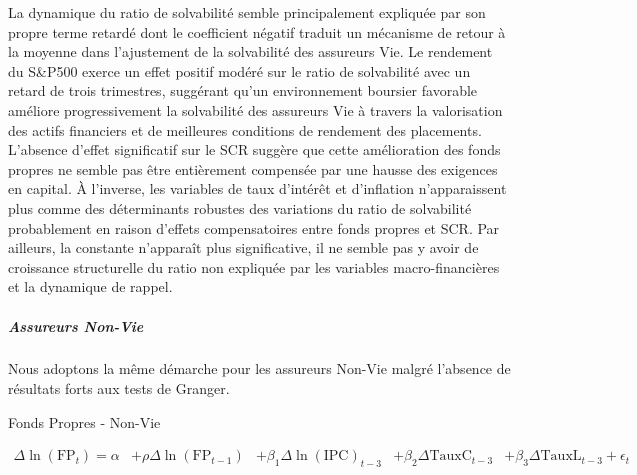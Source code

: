 \documentclass[
]{article}
\begin{document}
La dynamique du ratio de solvabilité semble principalement expliquée par
son propre terme retardé dont le coefficient négatif traduit un
mécanisme de retour à la moyenne dans l'ajustement de la solvabilité des
assureurs Vie. Le rendement du S\&P500 exerce un effet positif modéré
sur le ratio de solvabilité avec un retard de trois trimestres,
suggérant qu'un environnement boursier favorable améliore
progressivement la solvabilité des assureurs Vie à travers la
valorisation des actifs financiers et de meilleures conditions de
rendement des placements. L'absence d'effet significatif sur le SCR
suggère que cette amélioration des fonds propres ne semble pas être
entièrement compensée par une hausse des exigences en capital. À
l'inverse, les variables de taux d'intérêt et d'inflation n'apparaissent
plus comme des déterminants robustes des variations du ratio de
solvabilité probablement en raison d'effets compensatoires entre fonds
propres et SCR. Par ailleurs, la constante n'apparaît plus
significative, il ne semble pas y avoir de croissance structurelle du
ratio non expliquée par les variables macro-financières et la dynamique
de rappel.

\subparagraph{\texorpdfstring{Assureurs Non-Vie\\
}{Assureurs Non-Vie }}\label{assureurs-non-vie}

\hfill\break
Nous adoptons la même démarche pour les assureurs Non-Vie malgré
l'absence de résultats forts aux tests de Granger.

Fonds Propres - Non-Vie

\begin{equation}
\begin{aligned}
\Delta \ln(\text{FP}_t) = \alpha & + \rho \Delta \ln(\text{FP}_{t-1}) 
& + \beta_1 \Delta \ln(\text{IPC})_{t-3}
& + \beta_2 \Delta \text{TauxC}_{t-3}
& + \beta_3 \Delta \text{TauxL}_{t-3} + \epsilon_t
\end{aligned}
\end{equation}
\end{document}
